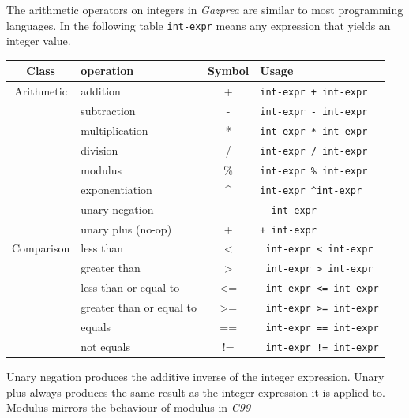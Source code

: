 \documentclass{article}
\begin{document}
		The arithmetic operators on integers in \textit{Gazprea} are similar to most programming languages. In the
		following table \texttt{int-expr} means any expression that yields an integer value.

		\begin{center}
			\begin{tabular}{|c|l|c|l|}
				\hline
				\textbf{Class} & \textbf{operation} & \textbf{Symbol} & \textbf{Usage} \\
				\hline
				Arithmetic & addition           & +  & \texttt{int-expr + int-expr}  \\
				           & subtraction        & -  &  \texttt{int-expr - int-expr} \\
				           & multiplication     & *  & \texttt{int-expr * int-expr}	 \\
				           & division           & /  & \texttt{int-expr / int-expr}	 \\
				           & modulus            & \% & \texttt{int-expr \% int-expr} \\
				           & exponentiation     & \textasciicircum & \texttt{int-expr \textasciicircum int-expr}	\\
				           & unary negation     & -  & \texttt{- int-expr}	         \\
				           & unary plus (no-op) & +  & \texttt{+ int-expr}           \\
				\hline
				Comparison & less than                & <  & \texttt{ int-expr < int-expr}  \\
				           & greater than             & >  & \texttt{ int-expr > int-expr}  \\
				           & less than or equal to    & <= & \texttt{ int-expr <= int-expr} \\
				           & greater than or equal to & >= & \texttt{ int-expr >= int-expr} \\
				           & equals                   & == & \texttt{ int-expr == int-expr} \\
				           & not equals               & != & \texttt{ int-expr != int-expr} \\
				\hline
			\end{tabular}
		\end{center}

		Unary negation produces the additive inverse of the integer expression. Unary plus always produces the same
		result as the integer expression it is applied to. Modulus mirrors the behaviour of modulus in \textit{C99}
\end{document}
